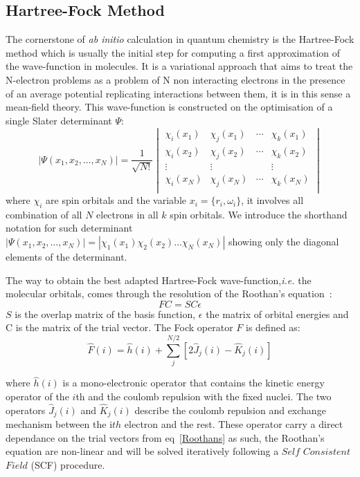 \documentclass[12pt]{report}
\numberwithin{equation}{section}
\begin{document}
\subsection{Hartree-Fock Method}
The cornerstone of \textit{ab initio} calculation in quantum chemistry is the Hartree-Fock method which is usually the initial step for computing a first approximation of the wave-function in molecules. 
It is a variational approach that aims to treat the N-electron problems as a problem of N non interacting electrons in the presence of an average potential replicating interactions between them, it is in this sense a mean-field theory.
This wave-function is constructed on the optimisation of a single Slater determinant $\Psi$\cite{slater_theory_1929}:
\begin{equation}
    |\Psi(x_1,x_2,\ldots,x_N)|=\frac{1}{\sqrt{N!}}
    \begin{vmatrix}
        \chi_i (x_1) & \chi_j (x_1) & \cdots & \chi_k (x_1)\\
        \chi_i (x_2) & \chi_j (x_2) & \cdots & \chi_k (x_2)\\
        \vdots & \vdots &   &  \vdots\\
        \chi_i (x_N) & \chi_j (x_N) & \cdots & \chi_k (x_N)\\
    \end{vmatrix}
\end{equation}
where $\chi_i$ are spin orbitals and the variable $x_i=\{r_i,\omega_i\}$, it involves all combination of all $N$ electrons in all $k$ spin orbitals. 
We introduce the shorthand notation for such determinant $|\Psi(x_1,x_2,\ldots,x_N)|=|\chi_1(x_1)\chi_2(x_2)\ldots\chi_N(x_N)|$ showing only the diagonal elements of the determinant.

The way to obtain the best adapted Hartree-Fock wave-function,\textit{i.e.} the molecular orbitals, comes through the resolution of the Roothan's equation~\cite{roothaan_new_1951}:
\begin{equation}\label{Roothans}
    FC=SC\epsilon
\end{equation}
$S$ is the overlap matrix of the basis function, $\epsilon$ the matrix of orbital energies and C is the matrix of the trial vector.
The Fock operator $F$ is defined as:
\begin{equation}
    \hat{F}(i)=\hat{h}(i)+\sum_{j}^{N/2}[2\hat{J}_{j}(i)-\hat{K}_{j}(i)]
\end{equation}

where $\hat{h}(i)$ is a mono-electronic operator that contains the kinetic energy operator of the $i$th and the coulomb repulsion with the fixed nuclei.
The two operators $\hat{J}_{j}(i)$ and $\hat{K}_{j}(i)$ describe the coulomb repulsion and exchange mechanism between the i$th$ electron and the rest.
These operator carry a direct dependance on the trial vectors from eq~\ref{Roothans} as such, the Roothan's equation are non-linear and will be solved iteratively following a $Self$ $Consistent$ $Field$ (SCF) procedure.
\end{document}
